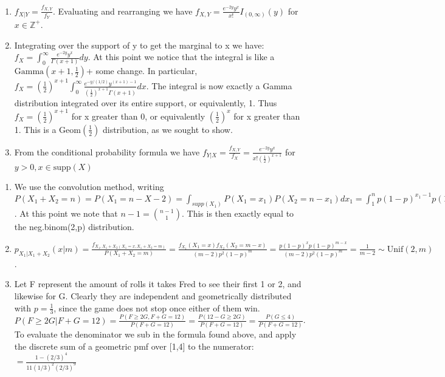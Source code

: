 \documentclass{article}
\begin{document}
\begin{prob}
\begin{enumerate}
	\item $f_{X|Y}=\frac{f_{X,Y}}{f_Y}$. Evaluating and rearranging we have $f_{X,Y}=\frac{e^{-2y}y^x}{x!}I_{(0,\infty)}(y)$ for $x\in \mathbb{Z}^+$. 
	\item Integrating over the support of y to get the marginal to x we have:
	$f_X=\int_{0}^{\infty}\frac{e^{-2y}y^x}{\Gamma(x+1)}dy$. At this point we notice that the integral is like a $\text{Gamma}(x+1,\frac{1}{2})$+ some change.
	In particular, $f_X=(\frac{1}{2})^{x+1}\int_{0}^{\infty}\frac{e^{-y/(1/2)}y^{(x+1)-1}}{(\frac{1}{2})^{x+1}\Gamma(x+1)}dx$.
	The integral is now exactly a Gamma distribution integrated over its entire support, or equivalently, 1.
	Thus $f_X= (\frac{1}{2})^{x+1}$ for x greater than 0, or equivalently $(\frac{1}{2})^x$ for x greater than 1. This is a $\text{Geom}(\frac{1}{2})$ distribution, as we sought to show.
\item From the conditional probability formula we have $f_{Y|X}=\frac{f_{X,Y}}{f_X}=\frac{e^{-2y}y^x}{x!(\frac{1}{2})^{x+1}}$ for $y>0, x\in \text{supp}(X)$
\end{enumerate}
\end{prob}

\begin{prob}
\begin{enumerate}
	\item We use the convolution method, writing $P(X_1+X_2=n)=P(X_1=n-X-2)=\int_{supp(X_1)}P(X_1=x_1)P(X_2=n-x_1)dx_1=\int_{1}^{n}p(1-p)^{x_1-1}p(1-p)^{n-x_1-1}dx_1=p^2(1-p)^{n-1}\int_{1}^{n}dx_1=(n-1)p^2(1-p)^{n-2}$. At this point we note that $n-1= {n-1 \choose 1}$. This is then exactly equal to the neg.binom(2,p) distribution.
	\item $p_{X_1|X_1+X_2}(x|m)=\frac{f_{X_1,X_1+X_2(X_1=x, X_1+X_2=m)}}{P(X_1+X_2=m)}=\frac{f_{X_1}(X_1=x)f_{X_2}(X_2=m-x)}{(m-2)p^2(1-p)^m}=\frac{p(1-p)^xp(1-p)^{m-x}}{(m-2)p^2(1-p)^{m}}=\frac{1}{m-2}\sim\text{Unif}(2,m)$.

	\item Let F represent the amount of rolls it takes Fred to see their first 1 or 2, and likewise for G. Clearly they are independent and geometrically distributed with $p=\frac{1}{3}$, since the game does not stop once either of them win.
		$P(F\geq2G|F+G=12)=\frac{P(F\geq2G, F+G=12)}{P(F+G=12)}=\frac{P(12-G\geq 2G)}{P(F+G=12)}=\frac{P(G\leq4)}{P(F+G=12)}$. To evaluate the denominator we sub in the formula found above, and apply the discrete sum of a geometric pmf over [1,4] to the numerator:
	$=\frac{1-(2/3)^4}{11(1/3)^2(2/3)^9}$
\end{enumerate}
\end{prob}
\end{document}
